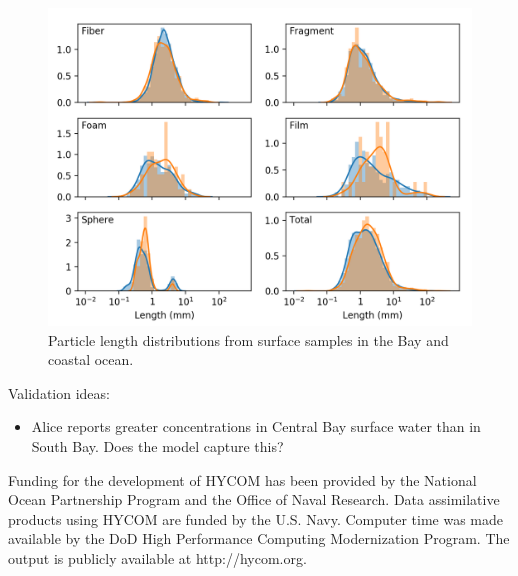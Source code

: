 \documentclass[draft]{jgr/agujournal2019}
\begin{document}
\begin{figure}
  \includegraphics{figures/manta-bay_vs_coast-length_distribution.png}
  \caption{Particle length distributions from surface samples in the Bay and
    coastal ocean.}
  \label{surface_size_distributions}
\end{figure}

Validation ideas:
\begin{itemize}
  \item Alice reports greater concentrations in Central Bay surface
    water than in South Bay. Does the model capture this?
\end{itemize}


Funding for the development of HYCOM has been provided by the National
Ocean Partnership Program and the Office of Naval Research. Data
assimilative products using HYCOM are funded by the
U.S. Navy. Computer time was made available by the DoD High
Performance Computing Modernization Program. The output is publicly
available at http://hycom.org.


\end{document}
